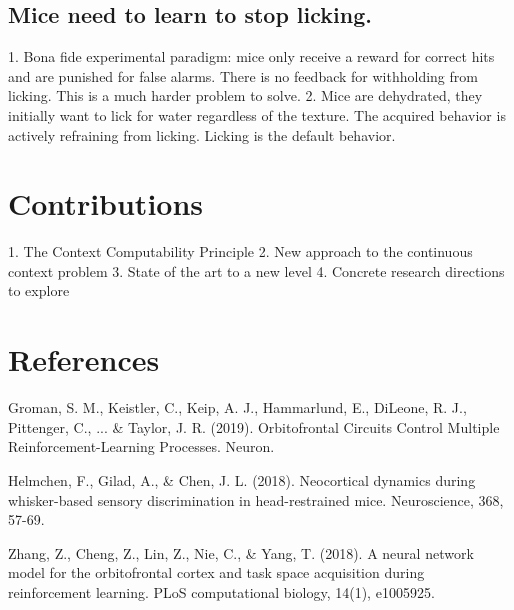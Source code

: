 \documentclass[]{article}
\begin{document}
\subsection{Mice need to learn to stop licking.}
1. Bona fide experimental paradigm: mice only receive a reward for correct hits and are punished for false alarms.  There is no feedback for withholding from licking.  This is a much harder problem to solve.
2. Mice are dehydrated, they initially want to lick for water regardless of the texture.  The acquired behavior is actively refraining from licking.  Licking is the default behavior.

\section{Contributions}
1. The Context Computability Principle
2. New approach to the continuous context problem
3. State of the art to a new level
4. Concrete research directions to explore

\section{References}

Groman, S. M., Keistler, C., Keip, A. J., Hammarlund, E., DiLeone, R. J., Pittenger, C., ... \& Taylor, J. R. (2019). Orbitofrontal Circuits Control Multiple Reinforcement-Learning Processes. Neuron.

Helmchen, F., Gilad, A., \& Chen, J. L. (2018). Neocortical dynamics during whisker-based sensory discrimination in head-restrained mice. Neuroscience, 368, 57-69.

Zhang, Z., Cheng, Z., Lin, Z., Nie, C., \& Yang, T. (2018). A neural network model for the orbitofrontal cortex and task space acquisition during reinforcement learning. PLoS computational biology, 14(1), e1005925.
\end{document}
